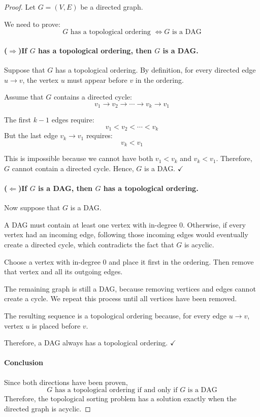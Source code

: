 \documentclass[12pt,a4paper]{article}
\theoremstyle{plain}
\theoremstyle{definition}
\theoremstyle{remark}
\begin{document}
\begin{proof}
Let $G=(V,E)$ be a directed graph.

We need to prove:
\[ G \text{ has a topological ordering } \iff G \text{ is a DAG} \]

\paragraph{($\Rightarrow$)\enspace If $G$ has a topological ordering, then $G$ is a DAG.}

Suppose that $G$ has a topological ordering. By definition, for every directed edge $u \to v$, the vertex $u$ must appear before $v$ in the ordering.

Assume that $G$ contains a directed cycle:
\[ v_1 \to v_2 \to \cdots \to v_k \to v_1 \]

The first $k-1$ edges require:
\[ v_1 < v_2 < \cdots < v_k \]
But the last edge $v_k \to v_1$ requires:
\[ v_k < v_1 \]

This is impossible because we cannot have both $v_1 < v_k$ and $v_k < v_1$.
Therefore, $G$ cannot contain a directed cycle. Hence, $G$ is a DAG. \hfill$\checkmark$

\paragraph{($\Leftarrow$)\enspace If $G$ is a DAG, then $G$ has a topological ordering.}

Now suppose that $G$ is a DAG.

A DAG must contain at least one vertex with in-degree 0. Otherwise, if every vertex had an incoming edge, following those incoming edges would eventually create a directed cycle, which contradicts the fact that $G$ is acyclic.

Choose a vertex with in-degree 0 and place it first in the ordering. Then remove that vertex and all its outgoing edges.

The remaining graph is still a DAG, because removing vertices and edges cannot create a cycle. We repeat this process until all vertices have been removed.

The resulting sequence is a topological ordering because, for every edge $u \to v$, vertex $u$ is placed before $v$.

Therefore, a DAG always has a topological ordering. \hfill$\checkmark$

\paragraph{Conclusion}
Since both directions have been proven,
\[ \boxed{G \text{ has a topological ordering if and only if } G \text{ is a DAG}} \]
Therefore, the topological sorting problem has a solution exactly when the directed graph is acyclic.
\end{proof}
\end{document}
